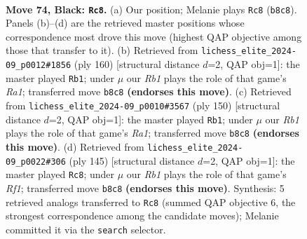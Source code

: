 \documentclass[11pt]{article}
\begin{document}
\clearpage

\begin{figure}[p]\centering
\begin{subfigure}{0.46\textwidth}\centering
\resizebox{\linewidth}{!}{%
\newchessgame
\chessboard[
  setfen={1r6/4R3/7k/8/5K2/8/7P/3r4 b - - 16 74},
  showmover=false,
  pgfstyle=straightmove, color=movearrow, markmove={b8-c8}
]}
\caption{}
\end{subfigure}\hfill
\begin{subfigure}{0.46\textwidth}\centering
\resizebox{\linewidth}{!}{%
\newchessgame
\chessboard[
  setfen={6k1/3r4/7K/8/6p1/8/8/R7 w - - 28 81},
  showmover=false,
  pgfstyle=straightmove, color=movearrow, markmove={a1-b1}
]}
\caption{}
\end{subfigure}
\\[4pt]
\begin{subfigure}{0.46\textwidth}\centering
\resizebox{\linewidth}{!}{%
\newchessgame
\chessboard[
  setfen={8/4r3/8/5K2/7p/8/7k/R7 w - - 18 76},
  showmover=false,
  pgfstyle=straightmove, color=movearrow, markmove={a1-b1}
]}
\caption{}
\end{subfigure}\hfill
\begin{subfigure}{0.46\textwidth}\centering
\resizebox{\linewidth}{!}{%
\newchessgame
\chessboard[
  setfen={5r2/8/8/8/4K2P/8/R7/7k b - - 1 73},
  showmover=false,
  pgfstyle=straightmove, color=movearrow, markmove={f8-c8}
]}
\caption{}
\end{subfigure}
\caption{\textbf{Move 74, Black: \texttt{Rc8}.} (a) Our position; Melanie plays \texttt{Rc8} (\texttt{b8c8}). Panels (b)--(d) are the retrieved master positions whose correspondence most drove this move (highest QAP objective among those that transfer to it). (b) Retrieved from \texttt{lichess\_elite\_2024-09\_p0012\#1856} (ply 160) [structural distance $d$=2, QAP obj=1]: the master played \texttt{Rb1}; under $\mu$ our \emph{Rb1} plays the role of that game's \emph{Ra1}; transferred move \texttt{b8c8} \textbf{(endorses this move)}. (c) Retrieved from \texttt{lichess\_elite\_2024-09\_p0010\#3567} (ply 150) [structural distance $d$=2, QAP obj=1]: the master played \texttt{Rb1}; under $\mu$ our \emph{Rb1} plays the role of that game's \emph{Ra1}; transferred move \texttt{b8c8} \textbf{(endorses this move)}. (d) Retrieved from \texttt{lichess\_elite\_2024-09\_p0022\#306} (ply 145) [structural distance $d$=2, QAP obj=1]: the master played \texttt{Rc8}; under $\mu$ our \emph{Rb1} plays the role of that game's \emph{Rf1}; transferred move \texttt{b8c8} \textbf{(endorses this move)}. Synthesis: 5 retrieved analogs transferred to \texttt{Rc8} (summed QAP objective 6, the strongest correspondence among the candidate moves); Melanie committed it via the \texttt{search} selector.}
\label{fig:thought-m147}
\end{figure}
\end{document}
